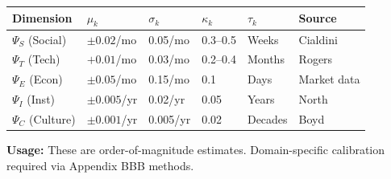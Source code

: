 \documentclass[11pt, a4paper]{article}
\begin{document}
\begin{tcolorbox}[colback=gray!5!white, colframe=gray!75!black,
    title=\textbf{Parameter Table: Context Drift by Dimension}]

\begin{center}
\renewcommand{\arraystretch}{1.3}
\begin{tabular}{@{}llllll@{}}
\toprule
\textbf{Dimension} & \textbf{$\mu_k$} & \textbf{$\sigma_k$} & \textbf{$\kappa_k$} & \textbf{$\tau_k$} & \textbf{Source} \\
\midrule
$\Psi_S$ (Social) & $\pm 0.02$/mo & 0.05/mo & 0.3--0.5 & Weeks & Cialdini \\
$\Psi_T$ (Tech) & $+0.01$/mo & 0.03/mo & 0.2--0.4 & Months & Rogers \\
$\Psi_E$ (Econ) & $\pm 0.05$/mo & 0.15/mo & 0.1 & Days & Market data \\
$\Psi_I$ (Inst) & $\pm 0.005$/yr & 0.02/yr & 0.05 & Years & North \\
$\Psi_C$ (Culture) & $\pm 0.001$/yr & 0.005/yr & 0.02 & Decades & Boyd \\
\bottomrule
\end{tabular}
\end{center}

\textbf{Usage:} These are order-of-magnitude estimates. Domain-specific calibration required via Appendix BBB methods.

\end{tcolorbox}
\end{document}
